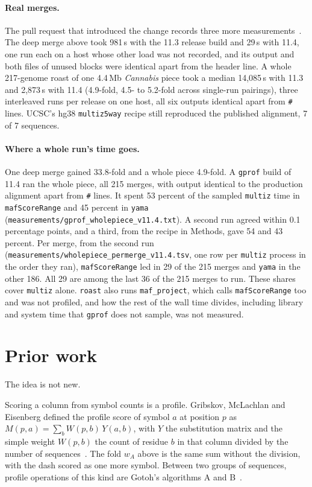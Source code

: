 \documentclass[11pt,letterpaper]{article}
\newcommand{\code}[1]{\texttt{#1}}
\begin{document}
\paragraph{Real merges.} The pull request that introduced the change records three more
measurements~\cite{multiz28}. The deep merge above took 981\,s with the 11.3 release build and 29\,s with 11.4, one run each on a host
whose other load was not recorded, and
its output and both files of unused blocks were identical apart from the header line. A whole 217-genome roast of
one 4.4\,Mb \emph{Cannabis} piece took a median 14,085\,s with 11.3 and 2,873\,s with 11.4 (4.9-fold, 4.5- to
5.2-fold across single-run pairings), three interleaved runs per release on one host, all six outputs identical
apart from \code{\#} lines. UCSC's hg38 \code{multiz5way} recipe still reproduced the published alignment, 7 of 7
sequences.

\paragraph{Where a whole run's time goes.} One deep merge gained 33.8-fold and a whole piece 4.9-fold. A \code{gprof}
build of 11.4 ran the whole piece, all 215 merges, with output identical to the production alignment apart from
\code{\#} lines. It spent 53 percent of the sampled \code{multiz} time in \code{mafScoreRange} and 45 percent in
\code{yama} (\code{measurements/gprof\_wholepiece\_v11.4.txt}). A second run agreed within 0.1 percentage points, and a third, from the recipe in Methods, gave 54 and 43 percent.
Per merge, from the second run (\code{measurements/wholepiece\_permerge\_v11.4.tsv}, one row per \code{multiz}
process in the order they ran), \code{mafScoreRange} led in 29 of the 215 merges and \code{yama} in the other 186.
All 29 are among the last 36 of the 215 merges to run. These shares cover \code{multiz} alone.
\code{roast} also runs \code{maf\_project}, which calls \code{mafScoreRange} too and was not profiled, and how the
rest of the wall time divides, including library and system time that \code{gprof} does not sample, was not
measured.

\section{Prior work}

The idea is not new.

Scoring a column from symbol counts is a profile. Gribskov, McLachlan and Eisenberg defined the profile score of
symbol $a$ at position $p$ as $M(p,a) = \sum_b W(p,b)\, Y(a,b)$, with $Y$ the substitution matrix and the simple
weight $W(p,b)$ the count of residue $b$ in that column divided by the number of sequences~\cite{gribskov1987}. The
fold $w_A$ above is the same sum without the division, with the dash scored as one more symbol. Between two groups
of sequences, profile operations of this kind are Gotoh's algorithms A and B~\cite{gotoh1993}.
\end{document}

